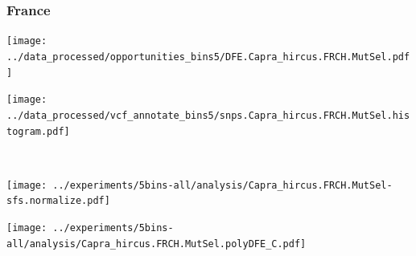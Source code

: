 \subsubsection{France}

\begin{minipage}{0.49\linewidth}
    \texttt{[image: ../data\_processed/opportunities\_bins5/DFE.Capra\_hircus.FRCH.MutSel.pdf]}
\end{minipage}
\begin{minipage}{0.49\linewidth}
    \texttt{[image: ../data\_processed/vcf\_annotate\_bins5/snps.Capra\_hircus.FRCH.MutSel.histogram.pdf]}
\end{minipage}
\\
\begin{minipage}{0.49\linewidth}
    \texttt{[image: ../experiments/5bins-all/analysis/Capra\_hircus.FRCH.MutSel-sfs.normalize.pdf]}
\end{minipage}
\begin{minipage}{0.4\linewidth}
    \texttt{[image: ../experiments/5bins-all/analysis/Capra\_hircus.FRCH.MutSel.polyDFE\_C.pdf]}
\end{minipage}
